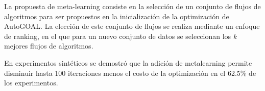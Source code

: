 \begin{conclusions}
    La propuesta de meta-learning consiste en la selección de un conjunto de
    flujos de algoritmos para ser propuestos en la inicialización de la
    optimización de AutoGOAL. La elección de este conjunto de flujos se realiza
    mediante un enfoque de ranking, en el que para un nuevo conjunto de datos
    se seleccionan los \emph{k} mejores flujos de algoritmos.

    En experimentos sintéticos se demostró que la adición de metalearning
    permite disminuir hasta 100 iteraciones menos el costo de la optimización
    en el 62.5\% de los experimentos.

\end{conclusions}
